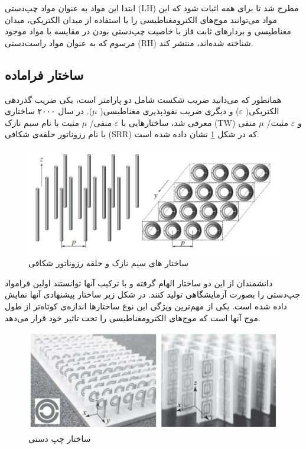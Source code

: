   
  ابتدا این مواد به عنوان مواد چپ‌دستی (LH) مطرح شد تا برای همه اثبات شود که این مواد می‌توانند موج‌های الکترومغناطیسی را با استفاده از میدان الکتریکی، میدان مغناطیسی و بردارهای ثابت فاز با خاصیت‌ چپ‌دستی بودن در مقایسه با مواد موجود مرسوم که به عنوان مواد راست‌دستی (RH) شناخته شده‌اند، منتشر کند.
  
  
\subsection{ساختار فراماده}
 
 همانطور که می‌دانید ضریب شکست شامل دو پارامتر است، یکی ضریب گذردهی الکتریکی(
 $\varepsilon$)
  و دیگری ضریب نفوذ‌پذیری مغناطیسی(
  $\mu$).
   در سال ۲۰۰۰ ساختاری معرفی شد، ساختارهایی با 
   $\varepsilon$
   منفی/ 
   $\mu$
   مثبت با نام سیم نازک (TW) و
   $\varepsilon$
    مثبت/
    $\mu$
     منفی با نام رزوناتور حلقه‌ی شکافی (SRR) که در شکل 
     \ref{fig33}
      نشان داده شده است.
 \cite{seee}
 
  \begin{figure}
 	\centering
 	\includegraphics[scale=0.3]{Images/fig33.png}
 	\caption{ساختار های سیم نازک و حلقه رزوناتور شکافی}
 	\label{fig33}
 \end{figure}
 
 
 دانشمندان از این دو ساختار الهام گرفته و با ترکیب آنها توانستند اولین فرامواد چپ‌دستی را بصورت آزمایشگاهی تولید کنند. در شکل زیر ساختار پیشنهادی آنها نمایش داده شده است. یکی از مهم‌ترین ویژگی این نوع ساختار‌ها اندازه‌ی کوتاه‌تر از طول موج آنها است که موج‌های الکترومغناطیسی را تحت تاثیر خود قرار می‌دهد.
 
 
\begin{figure}
	\centering
	\includegraphics[scale=0.3]{Images/fig34.png}
	\caption{ساختار چپ دستی}
	\label{fig34}
\end{figure}

